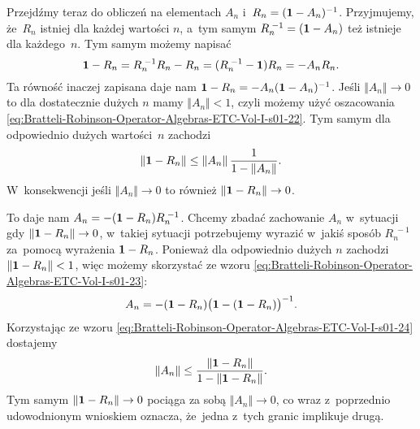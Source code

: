 \documentclass[a4paper,11pt]{article}
\begin{document}
Przejdźmy teraz do obliczeń na elementach $A_{ n }$
i~$R_{ n } = ( \mathbf{1} - A_{ n } )^{ -1 }$. Przyjmujemy, że~$R_{ n }$ istniej
dla każdej wartości $n$, a~tym samym
$R_{ n }^{ \; -1 } = ( \mathbf{1} - A_{ n } )$ też istnieje dla każdego~$n$. Tym
samym możemy napisać
\begin{equation}
  \label{eq:Bratteli-Robinson-Operator-Algebras-ETC-Vol-I-s01-28}
  \mathbf{1} - R_{ n } = R_{ n }^{ \; -1 } R_{ n } - R_{ n } =
  ( R_{ n }^{ \; -1 } - \mathbf{1} ) R_{ n } =
  -A_{ n } R_{ n }.
\end{equation}
Ta równość inaczej zapisana daje nam
$\mathbf{1} - R_{ n } = -A_{ n } ( \mathbf{1} - A_{ n } )^{ -1 }$. Jeśli
$\Vert A_{ n } \Vert \to 0$ to dla dostatecznie dużych $n$ mamy $\Vert A_{ n } \Vert < 1$,
czyli możemy użyć oszacowania
\eqref{eq:Bratteli-Robinson-Operator-Algebras-ETC-Vol-I-s01-22}. Tym samym
dla odpowiednio dużych wartości~$n$ zachodzi
\begin{equation}
  \label{eq:Bratteli-Robinson-Operator-Algebras-ETC-Vol-I-s01-01}
  \Vert \mathbf{1} - R_{ n } \Vert \leq
  \Vert A_{ n } \Vert \, \frac{ 1 }{ 1 - \Vert A_{ n } \Vert }.
\end{equation}
W~konsekwencji jeśli $\Vert A_{ n } \Vert \to 0$ to również
$\Vert \mathbf{1} - R_{ n } \Vert \to 0$.

To daje nam $A_{ n } = -( \mathbf{1} - R_{ n } ) R_{ n }^{ \; -1 }$. Chcemy zbadać
zachowanie $A_{ n }$ w~sytuacji gdy $\Vert \mathbf{1} - R_{ n } \Vert \to 0$, w~takiej
sytuacji potrzebujemy wyrazić w~jakiś sposób $R_{ n }^{ \; - 1 }$ za~pomocą
wyrażenia $\mathbf{1} - R_{ n }$. Ponieważ dla odpowiednio dużych $n$ zachodzi
$\Vert \mathbf{1} - R_{ n } \Vert < 1$, więc możemy skorzystać ze wzoru
\eqref{eq:Bratteli-Robinson-Operator-Algebras-ETC-Vol-I-s01-23}:
\begin{equation}
  \label{eq:Bratteli-Robinson-Operator-Algebras-ETC-Vol-I-s01-29}
  A_{ n } =
  -( \mathbf{1} - R_{ n } )
  \big( \mathbf{1} - ( \mathbf{1} - R_{ n } ) \big)^{ -1 }.
\end{equation}
Korzystając ze wzoru
\eqref{eq:Bratteli-Robinson-Operator-Algebras-ETC-Vol-I-s01-24} dostajemy
\begin{equation}
  \label{eq:Bratteli-Robinson-Operator-Algebras-ETC-Vol-I-s01-30}
  \Vert A_{ n } \Vert \leq
  \frac{ \Vert \mathbf{1} - R_{ n } \Vert }{ 1 - \Vert \mathbf{1} - R_{ n } \Vert }.
\end{equation}
Tym samym $\Vert \mathbf{1} - R_{ n } \Vert \to 0$ pociąga za sobą $\Vert A_{ n } \Vert \to 0$, co
wraz z~poprzednio udowodnionym wnioskiem oznacza, że~jedna z~tych granic
implikuje drugą.
\end{document}

